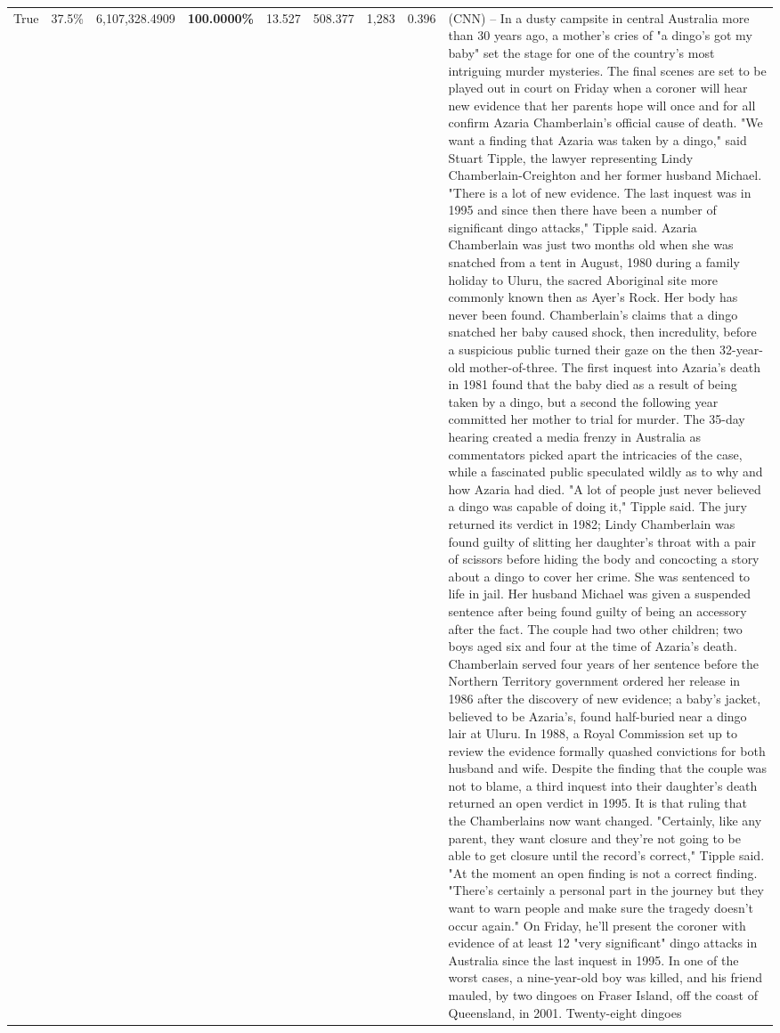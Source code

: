 \begin{table}[H]
\begin{tabular}{lllrlllll}
True & 37.5\% & 6,107,328.4909 & \bfseries \color{red} 100.0000\% & 13.527 & 508.377 & 1,283 & 0.396 & (CNN) -- In a dusty campsite in central Australia more than 30 years ago, a mother's cries of "a dingo's got my baby" set the stage for one of the country's most intriguing murder mysteries. The final scenes are set to be played out in court on Friday when a coroner will hear new evidence that her parents hope will once and for all confirm Azaria Chamberlain's official cause of death. "We want a finding that Azaria was taken by a dingo," said Stuart Tipple, the lawyer representing Lindy Chamberlain-Creighton and her former husband Michael. "There is a lot of new evidence. The last inquest was in 1995 and since then there have been a number of significant dingo attacks," Tipple said. Azaria Chamberlain was just two months old when she was snatched from a tent in August, 1980 during a family holiday to Uluru, the sacred Aboriginal site more commonly known then as Ayer's Rock. Her body has never been found. Chamberlain's claims that a dingo snatched her baby caused shock, then incredulity, before a suspicious public turned their gaze on the then 32-year-old mother-of-three. The first inquest into Azaria's death in 1981 found that the baby died as a result of being taken by a dingo, but a second the following year committed her mother to trial for murder. The 35-day hearing created a media frenzy in Australia as commentators picked apart the intricacies of the case, while a fascinated public speculated wildly as to why and how Azaria had died. "A lot of people just never believed a dingo was capable of doing it," Tipple said. The jury returned its verdict in 1982; Lindy Chamberlain was found guilty of slitting her daughter's throat with a pair of scissors before hiding the body and concocting a story about a dingo to cover her crime. She was sentenced to life in jail. Her husband Michael was given a suspended sentence after being found guilty of being an accessory after the fact. The couple had two other children; two boys aged six and four at the time of Azaria's death. Chamberlain served four years of her sentence before the Northern Territory government ordered her release in 1986 after the discovery of new evidence; a baby's jacket, believed to be Azaria's, found half-buried near a dingo lair at Uluru. In 1988, a Royal Commission set up to review the evidence formally quashed convictions for both husband and wife. Despite the finding that the couple was not to blame, a third inquest into their daughter's death returned an open verdict in 1995. It is that ruling that the Chamberlains now want changed. "Certainly, like any parent, they want closure and they're not going to be able to get closure until the record's correct," Tipple said. "At the moment an open finding is not a correct finding. "There's certainly a personal part in the journey but they want to warn people and make sure the tragedy doesn't occur again." On Friday, he'll present the coroner with evidence of at least 12 "very significant" dingo attacks in Australia since the last inquest in 1995. In one of the worst cases, a nine-year-old boy was killed, and his friend mauled, by two dingoes on Fraser Island, off the coast of Queensland, in 2001. Twenty-eight dingoes 
\end{tabular}
\end{table}

